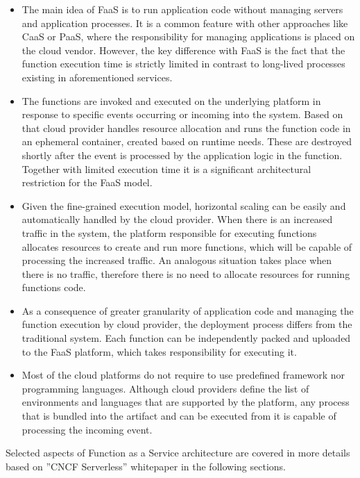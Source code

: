 \begin{itemize}
    \item The main idea of FaaS is to run application code without managing servers and application processes. It is a common feature with other approaches like CaaS or PaaS, where the responsibility for managing applications is placed on the cloud vendor. However, the key difference with FaaS is the fact that the function execution time is strictly limited in contrast to long-lived processes existing in aforementioned services.
    \item The functions are invoked and executed on the underlying platform in response to specific events occurring or incoming into the system. Based on that cloud provider handles resource allocation and runs the function code in an ephemeral container, created based on runtime needs. These are destroyed shortly after the event is processed by the application logic in the function. Together with limited execution time it is a significant architectural restriction for the FaaS model.
    \item Given the fine-grained execution model, horizontal scaling can be easily and automatically handled by the cloud provider. When there is an increased traffic in the system, the platform responsible for executing functions allocates resources to create and run more functions, which will be capable of processing the increased traffic. An analogous situation takes place when there is no traffic, therefore there is no need to allocate resources for running functions code.
    \item As a consequence of greater granularity of application code and managing the function execution by cloud provider, the deployment process differs from the traditional system. Each function can be independently packed and uploaded to the FaaS platform, which takes responsibility for executing it.
    \item Most of the cloud platforms do not require to use predefined framework nor programming languages. Although cloud providers define the list of environments and languages that are supported by the platform, any process that is bundled into the artifact and can be executed from it is capable of processing the incoming event.
\end{itemize}

Selected aspects of Function as a Service architecture are covered in more details based on ''CNCF Serverless'' whitepaper \cite{CNCFServerless} in the following sections.

